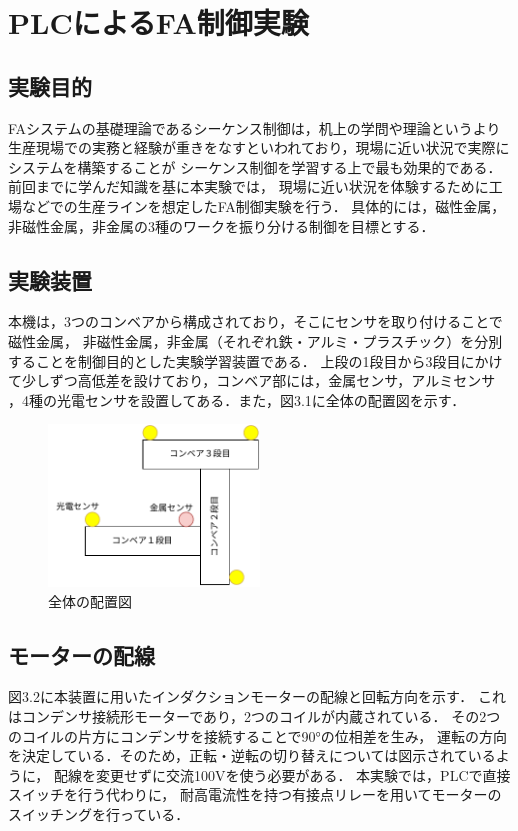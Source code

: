 
\section{PLCによるFA制御実験}

\subsection{実験目的}
FAシステムの基礎理論であるシーケンス制御は，机上の学問や理論というより
生産現場での実務と経験が重きをなすといわれており，現場に近い状況で実際にシステムを構築することが
シーケンス制御を学習する上で最も効果的である．前回までに学んだ知識を基に本実験では，
現場に近い状況を体験するために工場などでの生産ラインを想定したFA制御実験を行う．
具体的には，磁性金属，非磁性金属，非金属の3種のワークを振り分ける制御を目標とする．

\subsection{実験装置}
本機は，3つのコンベアから構成されており，そこにセンサを取り付けることで磁性金属，
非磁性金属，非金属（それぞれ鉄・アルミ・プラスチック）を分別することを制御目的とした実験学習装置である．
上段の1段目から3段目にかけて少しずつ高低差を設けており，コンベア部には，金属センサ，アルミセンサ
，4種の光電センサを設置してある．また，図3.1に全体の配置図を示す．

\begin{figure}[h]
  \centering
  \includegraphics[width=0.5\textwidth]{sozai/6.pdf}
  \caption{全体の配置図}
\end{figure}

\subsection{モーターの配線}
図3.2に本装置に用いたインダクションモーターの配線と回転方向を示す．
これはコンデンサ接続形モーターであり，2つのコイルが内蔵されている．
その2つのコイルの片方にコンデンサを接続することで90°の位相差を生み，
運転の方向を決定している．そのため，正転・逆転の切り替えについては図示されているように，
配線を変更せずに交流100Vを使う必要がある．
本実験では，PLCで直接スイッチを行う代わりに，
耐高電流性を持つ有接点リレーを用いてモーターのスイッチングを行っている．

